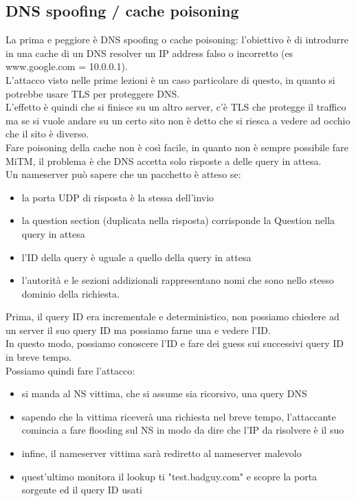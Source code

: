\documentclass[12pt, oneside]{extbook} %
\begin{document}
\subsection{DNS spoofing / cache poisoning}
La prima e peggiore è DNS spoofing o cache poisoning: l'obiettivo è di introdurre in una cache di un DNS resolver un IP address falso o incorretto (es www.google.com = 10.0.0.1).
\\L'attacco visto nelle prime lezioni è un caso particolare di questo, in quanto si potrebbe usare TLS per proteggere DNS.
\\L'effetto è quindi che si finisce su un altro server, c'è TLS che protegge il traffico ma se si vuole andare su un certo sito non è detto che si riesca a vedere ad occhio che il sito è diverso.
\\Fare poisoning della cache non è così facile, in quanto non è sempre possibile fare MiTM, il problema è che DNS accetta solo risposte a delle query in attesa.
\\Un nameserver può sapere che un pacchetto è atteso se:
\begin{itemize}
	\item la porta UDP di risposta è la stessa dell'invio
	\item la question section (duplicata nella risposta) corrisponde la Question nella query in attesa
    \item l'ID della query è uguale a quello della query in attesa
	\item l'autorità e le sezioni addizionali rappresentano nomi che sono nello stesso dominio della richiesta.
\end{itemize}
Prima, il query ID era incrementale e deterministico, non possiamo chiedere ad un server il suo query ID ma possiamo farne una e vedere l'ID.
\\In questo modo, possiamo conoscere l'ID e fare dei guess sui successivi query ID in breve tempo.
\\Possiamo quindi fare l'attacco:
\begin{itemize}
	\item si manda al NS vittima, che si assume sia ricorsivo, una query DNS
	\item sapendo che la vittima riceverà una richiesta nel breve tempo, l'attaccante comincia a fare flooding sul NS in modo da dire che l'IP da risolvere è il suo
	\item infine, il nameserver vittima sarà rediretto al nameserver malevolo
    \item quest'ultimo monitora il lookup ti "test.badguy.com" e scopre la porta sorgente ed il query ID usati
\end{itemize}
\end{document}
